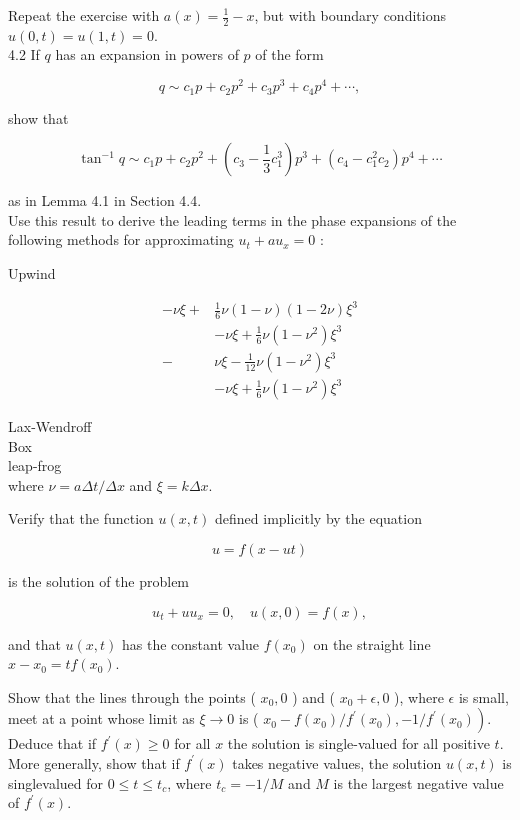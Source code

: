 \documentclass[10pt]{article}
\begin{document}
Repeat the exercise with \(a(x)=\frac{1}{2}-x\), but with boundary conditions \(u(0, t)=u(1, t)=0\).\\
4.2 If \(q\) has an expansion in powers of \(p\) of the form

\[
q \sim c_{1} p+c_{2} p^{2}+c_{3} p^{3}+c_{4} p^{4}+\cdots,
\]

show that

\[
\tan ^{-1} q \sim c_{1} p+c_{2} p^{2}+\left(c_{3}-\frac{1}{3} c_{1}^{3}\right) p^{3}+\left(c_{4}-c_{1}^{2} c_{2}\right) p^{4}+\cdots
\]

as in Lemma 4.1 in Section 4.4.\\
Use this result to derive the leading terms in the phase expansions of the following methods for approximating \(u_{t}+a u_{x}=0\) :

Upwind

\[
\begin{aligned}
-\nu \xi+ & \frac{1}{6} \nu(1-\nu)(1-2 \nu) \xi^{3} \\
& -\nu \xi+\frac{1}{6} \nu\left(1-\nu^{2}\right) \xi^{3} \\
- & \nu \xi-\frac{1}{12} \nu\left(1-\nu^{2}\right) \xi^{3} \\
& -\nu \xi+\frac{1}{6} \nu\left(1-\nu^{2}\right) \xi^{3}
\end{aligned}
\]

Lax-Wendroff\\
Box\\
leap-frog\\
where \(\nu=a \Delta t / \Delta x\) and \(\xi=k \Delta x\).

Verify that the function \(u(x, t)\) defined implicitly by the equation

\[
u=f(x-u t)
\]

is the solution of the problem

\[
u_{t}+u u_{x}=0, \quad u(x, 0)=f(x),
\]

and that \(u(x, t)\) has the constant value \(f\left(x_{0}\right)\) on the straight line \(x-x_{0}=t f\left(x_{0}\right)\).

Show that the lines through the points ( \(x_{0}, 0\) ) and ( \(x_{0}+\epsilon, 0\) ), where \(\epsilon\) is small, meet at a point whose limit as \(\xi \rightarrow 0\) is ( \(x_{0}- \left.f\left(x_{0}\right) / f^{\prime}\left(x_{0}\right),-1 / f^{\prime}\left(x_{0}\right)\right)\). Deduce that if \(f^{\prime}(x) \geq 0\) for all \(x\) the solution is single-valued for all positive \(t\). More generally, show that if \(f^{\prime}(x)\) takes negative values, the solution \(u(x, t)\) is singlevalued for \(0 \leq t \leq t_{c}\), where \(t_{c}=-1 / M\) and \(M\) is the largest negative value of \(f^{\prime}(x)\).
\end{document}
